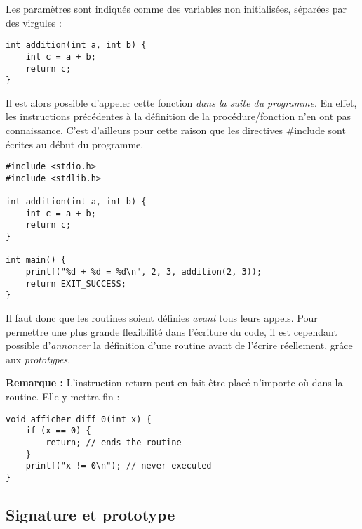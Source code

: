 \documentclass[../../../main.tex]{subfiles}
\begin{document}
Les paramètres sont indiqués comme des variables non initialisées, séparées par des virgules :
\begin{verbatim}
int addition(int a, int b) {
	int c = a + b;
	return c;
}
\end{verbatim}
Il est alors possible d'appeler cette fonction \textit{dans la suite du programme}. En effet, les instructions précédentes à la définition de la procédure/fonction n'en ont pas connaissance. C'est d'ailleurs pour cette raison que les directives \textsf{\#include} sont écrites au début du programme.
\begin{verbatim}
#include <stdio.h>
#include <stdlib.h>

int addition(int a, int b) {
	int c = a + b;
	return c;
}

int main() {
	printf("%d + %d = %d\n", 2, 3, addition(2, 3));
	return EXIT_SUCCESS;
}
\end{verbatim}
Il faut donc que les routines soient définies \textit{avant} tous leurs appels. Pour permettre une plus grande flexibilité dans l'écriture du code, il est cependant possible d'\textit{annoncer} la définition d'une routine avant de l'écrire réellement, grâce aux \textit{prototypes}.
 
\textbf{Remarque :} L'instruction \textsf{return} peut en fait être placé n'importe où dans la routine. Elle y mettra fin :
\begin{verbatim}
void afficher_diff_0(int x) {
	if (x == 0) {
		return; // ends the routine
	}
	printf("x != 0\n"); // never executed
}
\end{verbatim}
\subsection{Signature et prototype}
\end{document}
